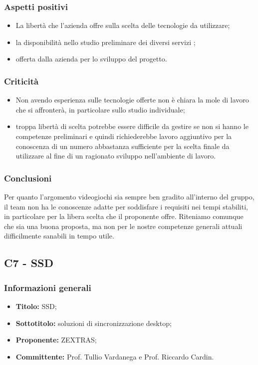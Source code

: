\documentclass[]{article}
\begin{document}
		\subsubsection{Aspetti positivi}
		\begin{itemize}
			\item La libertà che l'azienda offre sulla scelta delle tecnologie da utilizzare;
			\item la disponibilità nello studio preliminare dei diversi servizi ;
			\item {}  offerta dalla azienda per lo sviluppo del progetto.
		\end{itemize}

		\subsubsection{Criticità}
		\begin{itemize}
			\item Non avendo esperienza sulle tecnologie offerte non è chiara la mole di lavoro che si affronterà, in particolare sullo studio individuale;
			\item troppa libertà di scelta potrebbe essere difficile da gestire se non si hanno le competenze preliminari e quindi richiederebbe lavoro aggiuntivo per la conoscenza di un numero abbastanza sufficiente per la scelta finale da utilizzare al fine di un ragionato sviluppo nell'ambiente di lavoro.
		\end{itemize}

		\subsubsection{Conclusioni}
		Per quanto l'argomento videogiochi sia sempre ben gradito all'interno del gruppo, il team non ha le conoscenze adatte per soddisfare i requisiti nei tempi stabiliti, in particolare per la libera scelta che il proponente offre.
		Riteniamo comunque che sia una buona proposta, ma non per le nostre competenze generali attuali difficilmente sanabili in tempo utile.

		\newpage

        \subsection{C7 - SSD}
            \subsubsection{Informazioni generali}
            \begin{itemize}
                \item \textbf{Titolo:} SSD;
                \item \textbf{Sottotitolo:} soluzioni di sincronizzazione desktop;
                \item \textbf{Proponente:} ZEXTRAS;
                \item \textbf{Committente:} Prof. Tullio Vardanega e Prof. Riccardo Cardin.
            \end{itemize}
\end{document}
